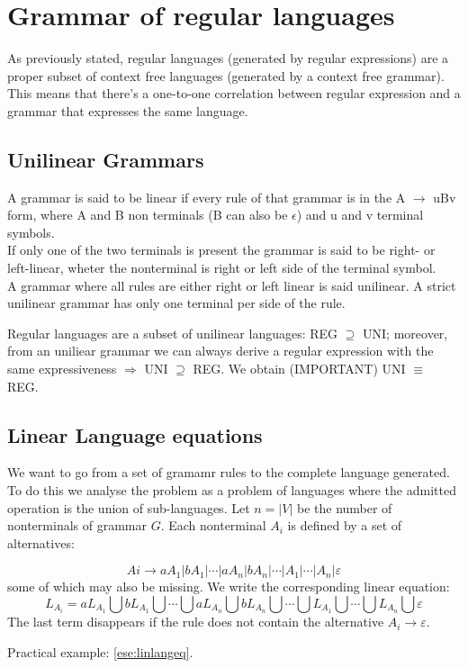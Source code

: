 	\section{Grammar of regular languages}
		As previously stated, regular languages (generated by regular expressions) are a proper subset of context free languages (generated by a context free grammar). This means that there's a one-to-one correlation between regular expression and a grammar that expresses the same language. 
		\subsection{Unilinear Grammars}
		\label{sec:uni_linear_grammars}
			A grammar is said to be linear if every rule of that grammar is in the A $\rightarrow$ uBv form, where A and B non terminals (B can also be $\epsilon$) and u and v terminal symbols.\\
			If only one of the two terminals is present the grammar is said to be right- or left-linear, wheter the nonterminal is right or left side of the terminal symbol.\\
			A grammar where all rules are either right or left linear is said unilinear. A strict unilinear grammar has only one terminal per side of the rule.\\
			\begin{property}
				Regular languages are a subset of unilinear languages: REG $\supseteq$ UNI; moreover, from an uniliear grammar we can always derive a regular expression
				with the same expressiveness $\Rightarrow$ UNI $\supseteq$ REG. We obtain (IMPORTANT) UNI $\equiv$ REG.
			\end{property}
		\subsection{Linear Language equations}\label{sect:linlangeq}
			We want to go from a set of gramamr rules to the complete language generated. To do this we analyse the problem as a problem of languages where the 
			admitted operation is the union of sub-languages.
			Let $n = \lvert V \rvert$ be the number of nonterminals of grammar $G$. Each nonterminal $A_i$ is defined by a set of alternatives:

			$$Ai \longrightarrow a A_1 \vert b A_1 \vert \cdots \vert a A_n \vert b A_n \vert \cdots \vert A_1 \vert \cdots \vert A_n \vert \varepsilon$$
			some of which may also be missing. We write the corresponding linear equation:
			$$L_{A_i} = a L_{A_1} \bigcup b L_{A_1} \bigcup \cdots \bigcup a L_{A_n} \bigcup b L_{A_n} \bigcup \cdots\bigcup L_{A_1} \bigcup \cdots \bigcup L_{A_n} \bigcup \varepsilon$$
			The last term disappears if the rule does not contain the alternative $A_i \rightarrow\varepsilon$.
			
			Practical example: \ref{ese:linlangeq}.